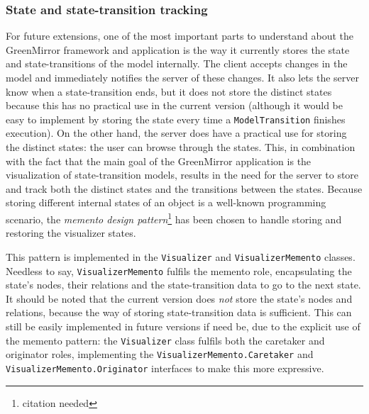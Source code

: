 \documentclass[a4paper]{article}
\begin{document}
	\subsubsection{State and state-transition tracking}\label{subsubsec:statetransitiontracking}
	For future extensions, one of the most important parts to understand about the GreenMirror framework and application is the way it currently stores the state and state-transitions of the model internally. The client accepts changes in the model and immediately notifies the server of these changes. It also lets the server know when a state-transition ends, but it does not store the distinct states because this has no practical use in the current version (although it would be easy to implement by storing the state every time a \lstinline{ModelTransition} finishes execution). On the other hand, the server does have a practical use for storing the distinct states: the user can browse through the states. This, in combination with the fact that the main goal of the GreenMirror application is the visualization of state-transition models, results in the need for the server to store and track both the distinct states and the transitions between the states. Because storing different internal states of an object is a well-known programming scenario, the \emph{memento design pattern}\footnote{citation needed} has been chosen to handle storing and restoring the visualizer states.
	
	This pattern is implemented in the \lstinline{Visualizer} and \lstinline{VisualizerMemento} classes. Needless to say, \lstinline{VisualizerMemento} fulfils the memento role, encapsulating the state's nodes, their relations and the state-transition data to go to the next state. It should be noted that the current version does \emph{not} store the state's nodes and relations, because the way of storing state-transition data is sufficient. This can still be easily implemented in future versions if need be, due to the explicit use of the memento pattern: the \lstinline{Visualizer} class fulfils both the caretaker and originator roles, implementing the \lstinline{VisualizerMemento.Caretaker} and \lstinline{VisualizerMemento.Originator} interfaces to make this more expressive.
	
\end{document}

